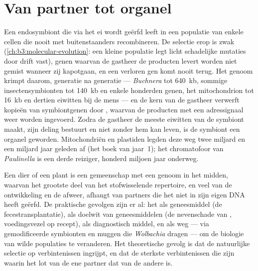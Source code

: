 \section{Van partner tot organel}

\begin{proposition}\label{prop:b3:microbiomes:reduction}
Een endosymbiont die via het ei wordt geërfd leeft in een populatie van
enkele cellen die nooit met buitenstaanders recombineren. De selectie
erop is zwak (\cref{ch:b3:molecular-evolution}: een kleine populatie
legt licht schadelijke mutaties door drift vast), genen waarvan de
gastheer de producten levert worden niet gemist wanneer zij kapotgaan,
en een verloren gen komt nooit terug. Het genoom krimpt daarom,
generatie na generatie --- \emph{Buchnera} tot \qty{640}{kb}, sommige
insectensymbionten tot \qty{140}{kb} en enkele honderden genen, het
mitochondrion tot \qty{16}{kb} en dertien eiwitten bij de mens --- en
de kern van de gastheer verwerft kopieën van symbiontgenen door
\emph{}, waarvan de producten met een
adressignaal weer worden ingevoerd. Zodra de gastheer de meeste
eiwitten van de symbiont maakt, zijn deling bestuurt en niet zonder
hem kan leven, is de symbiont een organel geworden. Mitochondriën en
plastiden legden deze weg twee miljard en een miljard jaar geleden af
(het boek van jaar~1); het chromatofoor van \emph{Paulinella} is een
derde reiziger, honderd miljoen jaar onderweg.
\end{proposition}

\begin{remark}\label{rem:b3:microbiomes:individual}
Een dier of een plant is een gemeenschap met een genoom in het midden,
waarvan het grootste deel van het stofwisselende repertoire, en veel
van de ontwikkeling en de afweer, afhangt van partners die het niet in
zijn eigen DNA heeft geërfd. De praktische gevolgen zijn er al: het
 als geneesmiddel (de fecestransplantatie), als doelwit van
geneesmiddelen (de nevenschade van , voedingsvezel op
recept), als diagnostisch middel, en als weg --- via gemodificeerde
symbionten en muggen die \emph{Wolbachia} dragen --- om de biologie van
wilde populaties te veranderen. Het theoretische gevolg is dat de
natuurlijke selectie op verbintenissen ingrijpt, en dat de sterkste
verbintenissen die zijn waarin het lot van de ene partner dat van de
andere is.
\end{remark}

